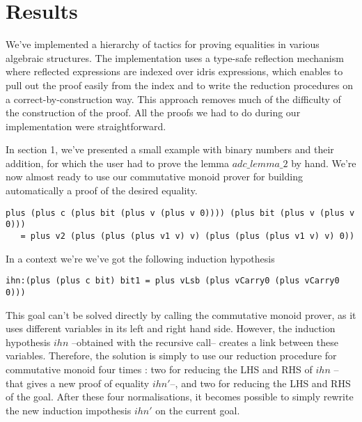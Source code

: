 \section {Results}
\label{sect:results}

We've implemented a hierarchy of tactics for proving equalities in various algebraic structures. The implementation uses a type-safe reflection mechanism where reflected expressions are indexed over idris expressions, which enables to pull out the proof easily from the index and to write the reduction procedures on a correct-by-construction way. This approach removes much of the difficulty of the construction of the proof. All the proofs we had to do during our implementation were straightforward.

In section 1, we've presented a small example with binary numbers and their addition, for which the user had to prove the lemma $adc\_lemma\_2$ by hand. We're now almost ready to use our commutative monoid prover for building automatically a proof of the desired equality.


\begin{lstlisting}
plus (plus c (plus bit (plus v (plus v 0)))) (plus bit (plus v (plus v 0))) 
   = plus v2 (plus (plus (plus v1 v) v) (plus (plus (plus v1 v) v) 0))
\end{lstlisting}

In a context we're we've got the following induction hypothesis 

\begin{lstlisting}
ihn:(plus (plus c bit) bit1 = plus vLsb (plus vCarry0 (plus vCarry0 0)))
\end{lstlisting}

This goal can't be solved directly by calling the commutative monoid prover, as it uses different variables in its left and right hand side. However, the induction hypothesis $ihn$ --obtained with the recursive call-- creates a link between these variables. Therefore, the solution is simply to use our reduction procedure for commutative monoid four times : two for reducing the LHS and RHS of $ihn$ --that gives a new proof of equality $ihn'$--, and two for reducing the LHS and RHS of the goal. After these four normalisations, it becomes possible to simply rewrite the new induction impothesis $ihn'$ on the current goal.

